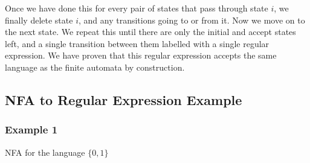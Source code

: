 \documentclass[11pt]{article}
\begin{document}
Once we have done this for every pair of states that pass through state $i$, we
finally delete state $i$, and any transitions going to or from it. Now we move
on to the next state. We repeat this until there are only the initial and accept
states left, and a single transition between them labelled with a single regular
expression. We have proven that this regular expression accepts the same
language as the finite automata by construction.


\subsection{NFA to Regular Expression Example}
\subsubsection{Example 1}
NFA for the language $\{0, 1\}$
\end{document}
